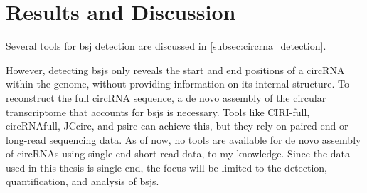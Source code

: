 \chapter{Results and Discussion}

Several tools for \gls{bsj} detection are discussed in
\cref{subsec:circrna_detection}.

However, detecting \gls{bsj}s only reveals the start and end positions of a
circRNA within the genome, without providing information on its internal
structure.
To reconstruct the full circRNA sequence, a de novo assembly of the circular
transcriptome that accounts for \gls{bsj}s is necessary.
Tools like CIRI-full, circRNAfull, JCcirc, and psirc can achieve this, but they
rely on paired-end or long-read sequencing data.
As of now, no tools are available for de novo assembly of circRNAs using
single-end short-read data, to my knowledge.
Since the data used in this thesis is single-end, the focus will be limited to
the detection, quantification, and analysis of \gls{bsj}s.





